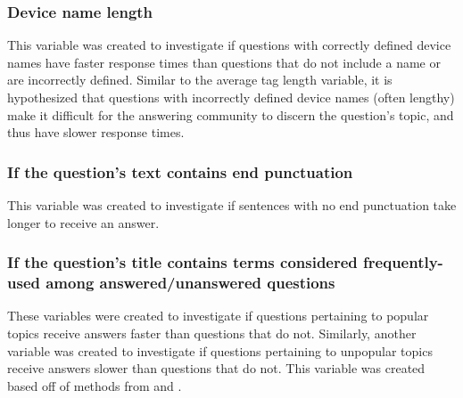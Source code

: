\documentclass[preprint]{elsarticle}\usepackage[]{graphicx}\usepackage[]{color}
\begin{document}

\subsubsection{Device name length}

This variable was created to investigate if questions with correctly defined device names have faster response times than questions that do not include a name or are incorrectly defined. Similar to the average tag length variable, it is hypothesized that questions with incorrectly defined device names (often lengthy) make it difficult for the answering community to discern the question's topic, and thus have slower response times. 


\subsubsection{If the question's text contains end punctuation}

This variable was created to investigate if sentences with no end punctuation take longer to receive an answer.


\subsubsection{If the question's title contains terms considered frequently-used among answered/unanswered questions}

These variables were created to investigate if questions pertaining to popular topics receive answers faster than questions that do not. Similarly, another variable was created to investigate if questions pertaining to unpopular topics receive answers slower than questions that do not. This variable was created based off of methods from \cite{Correa2013} and \cite{Ravi2014}.
\end{document}
